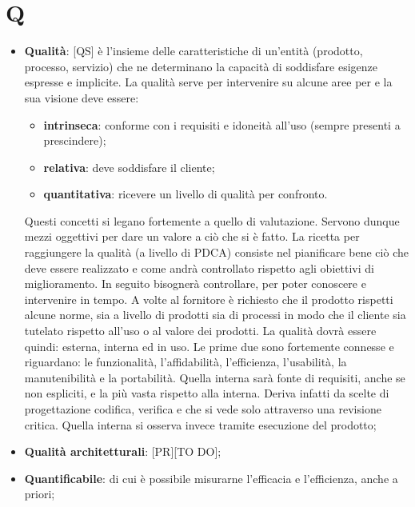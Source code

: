 %
%
%

\section{Q}

\begin{itemize}
	\item \textbf{Qualità}: [QS] è l'insieme delle caratteristiche di un'entità (prodotto, processo, servizio) che ne determinano la capacità di soddisfare esigenze espresse e implicite. La qualità serve per intervenire su alcune aree per e la sua visione deve essere:
		\begin{itemize}
			\item \textbf{intrinseca}: conforme con i requisiti e idoneità all'uso (sempre presenti a prescindere);
			\item \textbf{relativa}: deve soddisfare il cliente;
			\item \textbf{quantitativa}: ricevere un livello di qualità per confronto.
		\end{itemize}
		\noindent
		Questi concetti si legano fortemente a quello di valutazione. Servono dunque mezzi oggettivi per dare un valore a ciò che si è fatto. \newline
		La ricetta per raggiungere la qualità (a livello di PDCA) consiste nel pianificare bene ciò che deve essere realizzato e come andrà controllato rispetto agli obiettivi di miglioramento. In seguito bisognerà controllare, per poter conoscere e intervenire in tempo. \newline
		A volte al fornitore è richiesto che il prodotto rispetti alcune norme, sia a livello di prodotti sia di processi in modo che il cliente sia tutelato rispetto all'uso o al valore dei prodotti. \newline
		La qualità dovrà essere quindi: esterna, interna ed in uso. Le prime due sono fortemente connesse e riguardano: le funzionalità, l'affidabilità, l'efficienza, l'usabilità, la manutenibilità e la portabilità. Quella interna sarà fonte di requisiti, anche se non espliciti, e la più vasta rispetto alla interna. Deriva infatti da scelte di progettazione codifica, verifica e che si vede solo attraverso una revisione critica. Quella interna si osserva invece tramite esecuzione del prodotto;

		\item \textbf{Qualità architetturali}: [PR][TO DO];

	\item \textbf{Quantificabile}: di cui è possibile misurarne l'efficacia e l'efficienza, anche a priori;

\end{itemize}